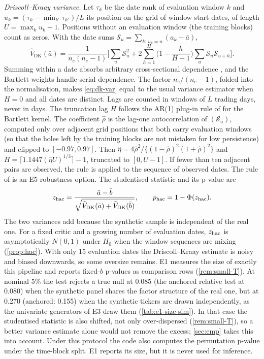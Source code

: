 \emph{Driscoll--Kraay variance.} Let $\tau_k$ be the date rank of evaluation window $k$ and
$u_k=(\tau_k-\min_{k'}\tau_{k'})/L$ its position on the grid of window start dates, of length
$U=\max_ku_k+1$. Positions without an evaluation window (the training blocks) count as zeros.
With the date sums $\mathcal S_u=\sum_{k:\,u_k=u}(a_k-\bar a)$,
\begin{equation}\label{eq:dk-var}
  \widehat V_{\mathrm{DK}}(\bar a)=\frac{1}{n_e(n_e-1)}\Big[\sum_{u}\mathcal S_u^2
  +2\sum_{h=1}^{H}\Big(1-\frac{h}{H+1}\Big)\sum_{u}\mathcal S_u\mathcal S_{u+h}\Big].
\end{equation}
Summing within a date absorbs arbitrary cross-sectional dependence \citep{driscoll1998consistent},
and the Bartlett weights \citep{newey1987simple} handle serial dependence. The factor
$n_e/(n_e-1)$, folded into the normalisation, makes \eqref{eq:dk-var} equal to the usual \iid{}
variance estimator when $H=0$ and all dates are distinct. Lags are counted in windows of $L$
trading days, never in days. The truncation lag $H$ follows the AR(1) plug-in rule of
\citet{andrews1991heteroskedasticity} for the Bartlett kernel. The coefficient $\hat\rho$ is the
lag-one autocorrelation of $(\mathcal S_u)$, computed only over adjacent grid positions that both
carry evaluation windows (so that the holes left by the training blocks are not mistaken for low
persistence) and clipped to $[-0.97,0.97]$. Then
$\hat\eta=4\hat\rho^2/\{(1-\hat\rho)^2(1+\hat\rho)^2\}$ and
$H=\lceil1.1447(\hat\eta U)^{1/3}\rceil-1$, truncated to $[0,U-1]$. If fewer than ten adjacent
pairs are observed, the rule is applied to the sequence of observed dates. The rule of
\citet{newey1994automatic} is an E5 robustness option. The studentised statistic and its
p-value are
\begin{equation}\label{eq:hac-z}
  z_{\mathrm{hac}}=\frac{\bar a-\bar b}{\sqrt{\widehat V_{\mathrm{DK}}(\bar a)+\widehat V_{\mathrm{DK}}(\bar b)}},
  \qquad p_{\mathrm{hac}}=1-\Phi(z_{\mathrm{hac}}).
\end{equation}
The two variances add because the synthetic sample is independent of the real one. For a fixed
critic and a growing number of evaluation dates, $z_{\mathrm{hac}}$ is asymptotically $N(0,1)$ under
$H_0$ when the window sequences are mixing (\cref{prop:hac}). With only 15 evaluation dates the
Driscoll--Kraay estimate is noisy and biased downwards, so some oversize remains. E1 measures the
size of exactly this pipeline and reports fixed-$b$ p-values \citep{kiefer_2005_new} as
comparison rows (\cref{rem:small-T}). At nominal 5\% the \WC{} test rejects a true null at 0.085
(the anchored relative test at 0.080) when the synthetic panel shares the factor structure of the
real one, but at 0.270 (anchored: 0.155) when the synthetic tickers are drawn independently, as
the univariate generators of E3 draw them (\cref{tab:e1-size-sim}). In that case the studentised
statistic is also shifted, not only over-dispersed (\cref{rem:small-T}), so a better variance
estimate alone would not remove the excess; \cref{sec:emp} takes this into account. Under this protocol the code also computes the permutation
p-value under the time-block split. E1 reports its size, but it is never used for inference.

